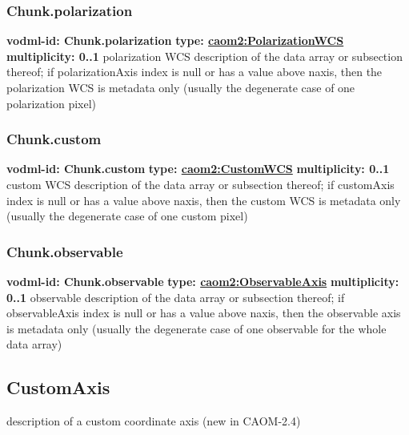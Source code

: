     \subsubsection{Chunk.polarization}
      \textbf{vodml-id: Chunk.polarization} \newline
      \textbf{type: \hyperref[sect:PolarizationWCS]{caom2:PolarizationWCS}} \newline
      \textbf{multiplicity: 0..1} \newline
      polarization WCS description of the data array or subsection thereof; if polarizationAxis index is null or has a value above {naxis}, then the polarization WCS is metadata only (usually the degenerate case of one polarization pixel)

    \subsubsection{Chunk.custom}
      \textbf{vodml-id: Chunk.custom} \newline
      \textbf{type: \hyperref[sect:CustomWCS]{caom2:CustomWCS}} \newline
      \textbf{multiplicity: 0..1} \newline
      custom WCS description of the data array or subsection thereof; if customAxis index is null or has a value above {naxis}, then the custom WCS is metadata only (usually the degenerate case of one custom pixel)

    \subsubsection{Chunk.observable}
      \textbf{vodml-id: Chunk.observable} \newline
      \textbf{type: \hyperref[sect:ObservableAxis]{caom2:ObservableAxis}} \newline
      \textbf{multiplicity: 0..1} \newline
      observable description of the data array or subsection thereof; if observableAxis index is null or has a value above {naxis}, then the observable axis is metadata only (usually the degenerate case of one observable for the whole data array)

  \subsection{CustomAxis}
  \label{sect:CustomAxis}
    description of a custom coordinate axis (new in CAOM-2.4)

